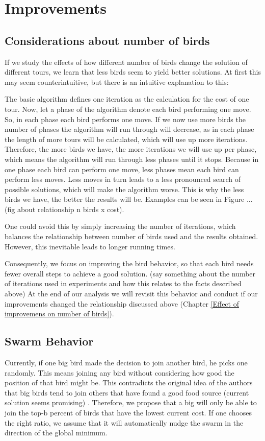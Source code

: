 \section{Improvements} \label{Improvements}
\subsection{Considerations about number of birds}
If we study the effects of how different number of birds change the solution of different tours, we learn that less birds seem to yield better solutions. At first this may seem counterintuitive, but there is an intuitive explanation to this:

The basic algorithm defines one iteration as the calculation for the cost of one tour. Now, let a phase of the algorithm denote each bird performing one move. So, in each phase each bird performs one move.
If we now use more birds the number of phases the algorithm will run through will decrease, as in each phase the length of more tours will be calculated, which will use up more iterations. Therefore, the more birds we have, the more iterations we will use up per phase, which means the algorithm will run through less phases until it stops. 
Because in one phase each bird can perform one move, less phases mean each bird can perform less moves. Less moves in turn leads to a less pronounced search of possible solutions, which will make the algorithm worse. This is why the less birds we have, the better the results will be.
Examples can be seen in Figure ... (fig about relationship n birds x cost).

One could avoid this by simply increasing the number of iterations, which balances the relationship between number of birds used and the results obtained. However, this inevitable leads to longer running times.

Consequently, we focus on improving the bird behavior, so that each bird needs fewer overall steps to achieve a good solution.
(say something about the number of iterations used in experiments and how this relates to the facts described above)
At the end of our analysis we will revisit this behavior and conduct if our improvements changed the relationship discussed above (Chapter \ref{Effect of improvemens on number of birds}).

\subsection{Swarm Behavior} \label{Swarm Behavior}
Currently, if one big bird made the decision to join another bird, he picks one randomly.
This means joining any bird without considering how good the position of that bird might be. This contradicts the original idea of the authors that big birds tend to join others that have found a good food source (current solution seems promising) \cite{afb}.
Therefore, we propose that a big will only be able to join the top-b percent of birds that have the lowest current cost. If one chooses the right ratio, we assume that it will automatically nudge the swarm in the direction of the global minimum.

